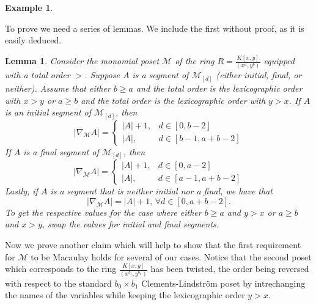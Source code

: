 \documentclass[11pt, reqno]{amsart}
\newcommand{\M}{{\mathcal M}}
\theoremstyle{plain} %
\newtheorem{lem}[thm]{Lemma}
\theoremstyle{definition}
\newtheorem{ex}[thm]{Example}
\theoremstyle{remark}
\numberwithin{equation}{section}  %
\begin{document}
\begin{ex}
\begin{center}
\end{center}
\end{ex}

To prove  we need a series of lemmas. We include the first without proof, as it is easily deduced. 

\begin{lem}\label{lemma: box segments}
 Consider the monomial poset $\M$ of the ring $R = \frac{K[x,y]}{(x^a,y^b)}$ equipped with a total order $>$. Suppose $A$ is a segment of $\M_{[d]}$ (either initial, final, or neither). Assume that either $b\geq a$ and the total order is the lexicographic order with $x>y$  or $a \geq b$ and the total order is the lexicographic order with $y>x$.  If $A$ is an initial segment of $\M_{[d]}$, then
    \begin{equation*}
    |\nabla_{\mathcal{M}}A| =
    \begin{cases}
        |A|+1, & d\in[0,b-2]\\
        |A|, & d\in[b-1,a+b-2]
    \end{cases}
    \end{equation*}
    If $A$ is a final segment of $\M_{[d]}$, then
    \begin{equation*}
        |\nabla_{\mathcal{M}}A| =
        \begin{cases}
            |A|+1, & d\in[0,a-2]\\
            |A|, & d\in[a-1,a+b-2]
        \end{cases}
    \end{equation*}
    Lastly, if $A$ is a segment that is neither initial nor a final, we have that 
    \[
     |\nabla_{\mathcal{M}}A| = |A| + 1, \, \forall d \in [0,a+b-2].
     \] To get the respective values for the case where either $b\geq a$ and $y>x$  or $a \geq b$ and $x>y$, swap the values for initial and final segments. 
\end{lem}
Now we prove another claim which will help to show that the first requirement for $\M$ to be Macaulay holds for several of our cases. Notice that the second poset which corresponds to the ring $\frac{K[x,y]}{(x^{b_1},y^{b_0})}$ has been twisted, the order being reversed with respect to the standard $b_0\times b_1$ Clements-Lindstr\"om poset by intrechanging the names of the variables while keeping the lexicographic order $y>x$.
\end{document}
